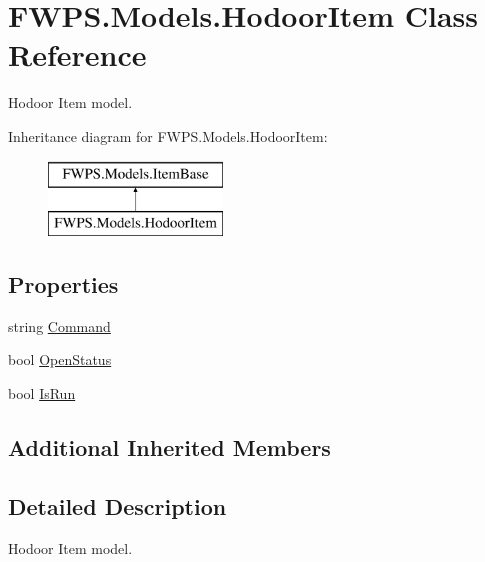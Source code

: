 \hypertarget{class_f_w_p_s_1_1_models_1_1_hodoor_item}{}\section{F\+W\+P\+S.\+Models.\+Hodoor\+Item Class Reference}
\label{class_f_w_p_s_1_1_models_1_1_hodoor_item}


Hodoor Item model.  


Inheritance diagram for F\+W\+P\+S.\+Models.\+Hodoor\+Item\+:\begin{figure}[H]
\begin{center}
\leavevmode
\includegraphics[height=2.000000cm]{class_f_w_p_s_1_1_models_1_1_hodoor_item}
\end{center}
\end{figure}
\subsection*{Properties}
\begin{DoxyCompactItemize}
\item 
string \mbox{\hyperlink{class_f_w_p_s_1_1_models_1_1_hodoor_item_ac274098dcab22dad8214011ab9d73fd0}{Command}}
\item 
bool \mbox{\hyperlink{class_f_w_p_s_1_1_models_1_1_hodoor_item_a0e8fd3b00cb80c1f38c86e44eeaeef21}{Open\+Status}}
\item 
bool \mbox{\hyperlink{class_f_w_p_s_1_1_models_1_1_hodoor_item_a51b5f23ecbe53ddd39842a7fba39ffba}{Is\+Run}}
\end{DoxyCompactItemize}
\subsection*{Additional Inherited Members}


\subsection{Detailed Description}
Hodoor Item model. 

